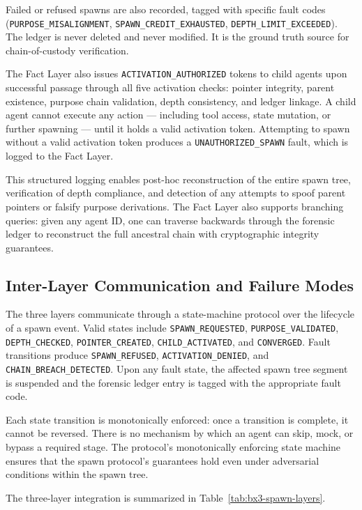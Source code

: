 Failed or refused spawns are also recorded, tagged with specific fault codes (\texttt{PURPOSE\_MISALIGNMENT}, \texttt{SPAWN\_CREDIT\_EXHAUSTED}, \texttt{DEPTH\_LIMIT\_EXCEEDED}). The ledger is never deleted and never modified. It is the ground truth source for chain-of-custody verification.

The Fact Layer also issues \texttt{ACTIVATION\_AUTHORIZED} tokens to child agents upon successful passage through all five activation checks: pointer integrity, parent existence, purpose chain validation, depth consistency, and ledger linkage. A child agent cannot execute any action — including tool access, state mutation, or further spawning — until it holds a valid activation token. Attempting to spawn without a valid activation token produces a \texttt{UNAUTHORIZED\_SPAWN} fault, which is logged to the Fact Layer.

This structured logging enables post-hoc reconstruction of the entire spawn tree, verification of depth compliance, and detection of any attempts to spoof parent pointers or falsify purpose derivations. The Fact Layer also supports branching queries: given any agent ID, one can traverse backwards through the forensic ledger to reconstruct the full ancestral chain with cryptographic integrity guarantees.

\subsection{Inter-Layer Communication and Failure Modes}

The three layers communicate through a state-machine protocol over the lifecycle of a spawn event. Valid states include \texttt{SPAWN\_REQUESTED}, \texttt{PURPOSE\_VALIDATED}, \texttt{DEPTH\_CHECKED}, \texttt{POINTER\_CREATED}, \texttt{CHILD\_ACTIVATED}, and \texttt{CONVERGED}. Fault transitions produce \texttt{SPAWN\_REFUSED}, \texttt{ACTIVATION\_DENIED}, and \texttt{CHAIN\_BREACH\_DETECTED}. Upon any fault state, the affected spawn tree segment is suspended and the forensic ledger entry is tagged with the appropriate fault code.

Each state transition is monotonically enforced: once a transition is complete, it cannot be reversed. There is no mechanism by which an agent can skip, mock, or bypass a required stage. The protocol's monotonically enforcing state machine ensures that the spawn protocol's guarantees hold even under adversarial conditions within the spawn tree.

The three-layer integration is summarized in Table~\ref{tab:bx3-spawn-layers}.

